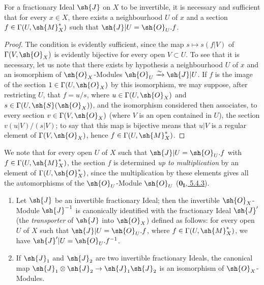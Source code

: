 \begin{proposition}[21.2.2]
\label{IV.21.2.2}
For a fractionary Ideal $\sh{J}$ on $X$ to be invertible, it is necessary and sufficient that for every $x\in X$, there exists a neighbourhood $U$ of $x$ and a section $f\in\Gamma(U,\sh{M}_X^*)$ such that $\sh{J}|U=\sh{O}_U.f$.
\end{proposition}

\begin{proof}
The condition is evidently sufficient, since the map $s\mapsto s(f|V)$ of $\Gamma(V,\sh{O}_X)$ is evidently bijective for every open $V\subset U$.
To see that it is necessary, let us note that there exists by hypothesis a neighbourhood $U$ of $x$ and an isomorphism of $\sh{O}_X$-Modules $\sh{O}_U\xrightarrow{\sim}\sh{J}|U$.
If $f$ is the image of the section $1\in\Gamma(U,\sh{O}_X)$ by this isomorphism, we may suppose, after restricting $U$, that $f=u/s$, where $u\in\Gamma(U,\sh{O}_X)$ and $s\in\Gamma(U,\sh{S}(\sh{O}_X))$, and the isomorphism considered then associates, to every section $v\in\Gamma(V,\sh{O}_X)$ (where $V$ is an open contained in $U$), the section $v(u|V)/(s|V)$;
to say that this map is bijective means that $u|V$ is a regular element of $\Gamma(V,\sh{O}_X)$, hence $f\in\Gamma(U,\sh{M}_X^*)$.
\end{proof}

We note that for every open $U$ of $X$ such that $\sh{J}|U=\sh{O}_U.f$ with $f\in\Gamma(U,\sh{M}_X^*)$, the section $f$ is determined \emph{up to multiplication} by an element of $\Gamma(U,\sh{O}_X^*)$, since the
multiplication by these elements gives all the automorphisms of the $\sh{O}_U$-Module $\sh{O}_U$ (\hyperref[0.5.4.3]{$\mathbf{0_I}$, 5.4.3}).

\begin{corollary}[21.2.3]
\label{IV.21.2.3}
\begin{enumerate}[label=(\roman*)]
  \item Let $\sh{J}$ be an invertible fractionary Ideal;
  then the invertible $\sh{O}_X$-Module $\sh{J}^{-1}$ is canonically identified with the fractionary Ideal $\sh{J}'$ (the \emph{transporter} of $\sh{J}$ into $\sh{O}_X$) defined as follows:
  for every open $U$ of $X$ such that $\sh{J}|U=\sh{O}_U.f$, where $f\in\Gamma(U,\sh{M}_X^*)$, we have $\sh{J}'|U=\sh{O}_U.f^{-1}$.
  \item If $\sh{J}_1$ and $\sh{J}_2$ are two invertible fractionary Ideals, the canonical map $\sh{J}_1\otimes\sh{J}_2\to\sh{J}_1\sh{J}_2$ is an isomorphism of $\sh{O}_X$-Modules.
\end{enumerate}
\end{corollary}

